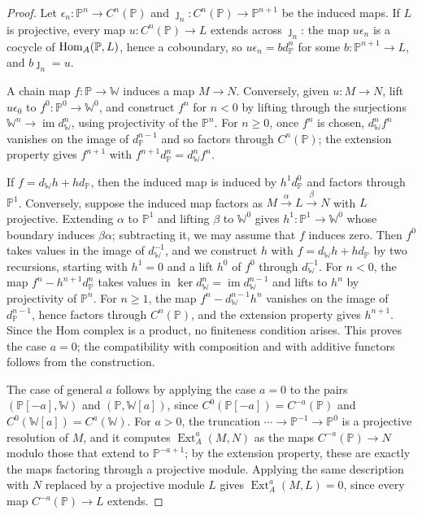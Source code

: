 \begin{proof}
  Let ${\epsilon_n\colon\mathbb{P}^n\to C^n(\mathbb{P})}$ and
  ${\jmath_n\colon C^n(\mathbb{P})\to\mathbb{P}^{n+1}}$ be the induced maps. If
  $L$ is projective, every map ${u\colon C^n(\mathbb{P})\to L}$ extends across
  $\jmath_n$: the map $u\epsilon_n$ is a cocycle of $\Hom[A]{\mathbb{P}}{L}$,
  hence a coboundary, so ${u\epsilon_n=bd^n_{\mathbb{P}}}$ for some
  ${b\colon\mathbb{P}^{n+1}\to L}$, and ${b\jmath_n=u}$.

  A chain map ${f\colon\mathbb{P}\to\mathbb{W}}$ induces a map ${M\to N}$.
  Conversely, given ${u\colon M\to N}$, lift $u\epsilon_0$ to
  ${f^0\colon\mathbb{P}^0\to\mathbb{W}^0}$, and construct $f^n$ for ${n<0}$ by
  lifting through the surjections ${\mathbb{W}^{n}\to\operatorname{im}
  d^{n}_{\mathbb{W}}}$, using projectivity of the $\mathbb{P}^n$. For ${n\geq0}$,
  once $f^n$ is chosen, $d^n_{\mathbb{W}}f^n$ vanishes on the image of
  $d^{n-1}_{\mathbb{P}}$ and so factors through $C^n(\mathbb{P})$; the
  extension property gives $f^{n+1}$ with
  ${f^{n+1}d^n_{\mathbb{P}}=d^n_{\mathbb{W}}f^n}$.

  If ${f=d_{\mathbb{W}}h+hd_{\mathbb{P}}}$, then the induced map is induced by
  $h^1d^0_{\mathbb{P}}$ and factors through $\mathbb{P}^1$. Conversely, suppose
  the induced map factors as ${M\xrightarrow{\alpha}L\xrightarrow{\beta}N}$ with
  $L$ projective. Extending $\alpha$ to $\mathbb{P}^1$ and lifting $\beta$ to
  $\mathbb{W}^0$ gives ${h^1\colon\mathbb{P}^1\to\mathbb{W}^0}$ whose boundary
  induces $\beta\alpha$; subtracting it, we may assume that $f$ induces zero.
  Then $f^0$ takes values in the image of $d^{-1}_{\mathbb{W}}$, and we
  construct $h$ with ${f=d_{\mathbb{W}}h+hd_{\mathbb{P}}}$ by two recursions,
  starting with ${h^1=0}$ and a lift $h^0$ of $f^0$ through
  $d^{-1}_{\mathbb{W}}$. For ${n<0}$, the map ${f^n-h^{n+1}d^n_{\mathbb{P}}}$ takes
  values in ${\ker d^n_{\mathbb{W}}=\operatorname{im}d^{n-1}_{\mathbb{W}}}$ and
  lifts to $h^n$ by projectivity of $\mathbb{P}^n$. For ${n\geq1}$, the map
  ${f^n-d^{n-1}_{\mathbb{W}}h^n}$ vanishes on the image of
  $d^{n-1}_{\mathbb{P}}$, hence factors through $C^n(\mathbb{P})$, and the
  extension property gives $h^{n+1}$. Since the Hom complex is a product, no
  finiteness condition arises. This proves the case ${a=0}$; the compatibility
  with composition and with additive functors follows from the construction.

  The case of general $a$ follows by applying the case ${a=0}$ to the pairs
  ${(\mathbb{P}[-a],\mathbb{W})}$ and $(\mathbb{P},\mathbb{W}[a])$, since
  ${C^0(\mathbb{P}[-a])=C^{-a}(\mathbb{P})}$ and ${C^0(\mathbb{W}[a])=
  C^a(\mathbb{W})}$. For ${a>0}$, the truncation ${\cdots\to\mathbb{P}^{-1}\to
  \mathbb{P}^0}$ is a projective resolution of $M$, and it computes
  $\operatorname{Ext}^a_A(M,N)$ as the maps ${C^{-a}(\mathbb{P})\to N}$ modulo
  those that extend to $\mathbb{P}^{-a+1}$; by the extension property, these
  are exactly the maps factoring through a projective module. Applying the
  same description with $N$ replaced by a projective module $L$ gives
  ${\operatorname{Ext}^a_A(M,L)=0}$, since every map ${C^{-a}(\mathbb{P})\to L}$
  extends.
\end{proof}

